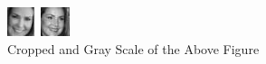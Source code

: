 \documentclass[12pt]{article} %
\begin{document}
\begin{figure}[H]
\begin{minipage}[b]{0.3\textwidth}
    \includegraphics[width=\textwidth]{part1_2a}
    \caption{Cropped and Gray Scale of the Above Figure}
  \end{minipage}
  \begin{minipage}[b]{0.3\textwidth}
    \includegraphics[width=\textwidth]{part1_2b}

\end{minipage}
\end{figure}
\end{document}
